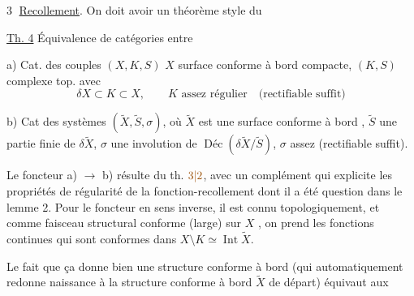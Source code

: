 \textcircled{3} \uline{Recollement}. On doit avoir un
théorème  style du

\uline{Th. 4} Équivalence de catégories entre

a) Cat. des couples $(X,K,S)$ $X$ surface conforme
à bord compacte, $(K,S)$ complexe top.  avec
\[
\delta X\subset K\subset X,\qquad K\text{ assez régulier}\quad\text{(rectifiable suffit)}
\]


b) Cat des systèmes $(\widetilde X,\widetilde S,\sigma)$, où
$\widetilde X$ est une surface conforme à bord ,
$\widetilde S$ une partie finie de $\delta\widetilde X$, $\sigma$ une
involution de $\operatorname{\text{Déc}}(\delta\widetilde X/\widetilde S)$, $\sigma$ assez
 (rectifiable suffit).

Le foncteur a) $\longrightarrow$ b) résulte du th. $\unsure{3|2}$,
avec un complément qui explicite les
propriétés de régularité de la fonction-recollement
dont il a été question dans
le lemme 2. Pour le foncteur en sens
inverse, il est connu topologiquement, et
comme faisceau structural conforme
(large) sur $X$ , on prend les fonctions
continues qui sont conformes dans $X\setminus K\simeq\operatorname{Int}\widetilde X$.

Le fait que ça donne bien une structure
conforme à bord  (qui automatiquement
redonne naissance  à la structure conforme
à bord $\widetilde X$ de départ) équivaut aux


